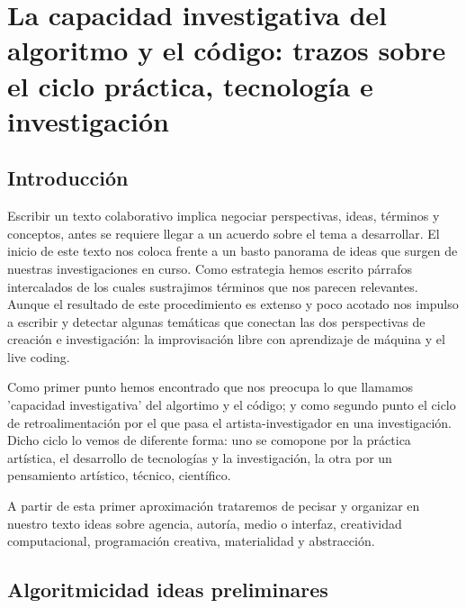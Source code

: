 \chapter{La capacidad investigativa del algoritmo y el código: trazos sobre el ciclo práctica, tecnología e investigación}

\author{Aaron Castañeda y Hernani Villaseñor}

\section{Introducción}
Escribir un texto colaborativo implica negociar perspectivas, ideas, términos y conceptos, antes se requiere llegar a un acuerdo sobre el tema a desarrollar. El inicio de este texto nos coloca frente a un basto panorama de ideas que surgen de nuestras investigaciones en curso. Como estrategia hemos escrito párrafos intercalados de los cuales sustrajimos términos que nos parecen relevantes. Aunque el resultado de este procedimiento es extenso y poco acotado nos impulso a escribir y detectar algunas temáticas que conectan las dos perspectivas de creación e investigación: la improvisación libre con aprendizaje de máquina y el live coding.

Como primer punto hemos encontrado que nos preocupa lo que llamamos 'capacidad investigativa' del algortimo y el código; y como segundo punto el ciclo de retroalimentación por el que pasa el artista-investigador en una investigación. Dicho ciclo lo vemos de diferente forma: uno se comopone por la práctica artística, el desarrollo de tecnologías y la investigación, la otra por un pensamiento artístico, técnico, científico.

A partir de esta primer aproximación trataremos de pecisar y organizar en nuestro texto ideas sobre agencia, autoría, medio o interfaz, creatividad computacional, programación creativa, materialidad y abstracción.

\section{Algoritmicidad ideas preliminares}

